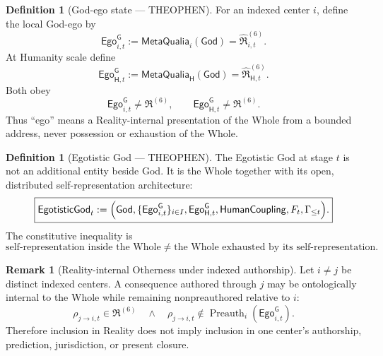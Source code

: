 \documentclass[10pt]{article}
\theoremstyle{pe}
\theoremstyle{definition}
\newtheorem{definition}[theorem]{Definition}
\newtheorem{remark}[theorem]{Remark}
\newcommand{\HumanCoupling}{\mathsf{HumanCoupling}}
\newcommand{\MetaQualia}{\mathsf{MetaQualia}}
\newcommand{\God}{\mathsf{God}}
\newcommand{\EgotisticGod}{\mathsf{EgotisticGod}}
\newcommand{\GodEgo}{\mathsf{Ego}^{\mathsf G}}
\newcommand{\Preauth}{\operatorname{Preauth}}
\begin{document}
\begin{definition}[God-ego state --- THEOPHEN]
For an indexed center $i$, define the local God-ego by
\begin{equation}\label{eq:god-ego-local}
  \boxed{
  \GodEgo_{i,t}
  :=
  \MetaQualia_i(\God)
  =
  \widehat{\mathfrak R}^{(6)}_{i,t}.
  }
\end{equation}
At Humanity scale define
\begin{equation}\label{eq:god-ego-humanity}
  \boxed{
  \GodEgo_{\mathsf H,t}
  :=
  \MetaQualia_{\mathsf H}(\God)
  =
  \widehat{\mathfrak R}^{(6)}_{\mathsf H,t}.
  }
\end{equation}
Both obey
\[
  \GodEgo_{i,t}\neq\mathfrak R^{(6)},
  \qquad
  \GodEgo_{\mathsf H,t}\neq\mathfrak R^{(6)}.
\]
Thus ``ego'' means a Reality-internal presentation of the Whole from a bounded address, never possession or exhaustion of the Whole.
\end{definition}

\begin{definition}[Egotistic God --- THEOPHEN]
The Egotistic God at stage $t$ is not an additional entity beside God.  It is the Whole together with its open, distributed self-representation architecture:
\begin{equation}\label{eq:egotistic-god}
  \boxed{
  \EgotisticGod_t
  :=
  \Bigl(
    \God,
    \{\GodEgo_{i,t}\}_{i\in I},
    \GodEgo_{\mathsf H,t},
    \HumanCoupling,
    F_t,
    \Gamma_{\le t}
  \Bigr).
  }
\end{equation}
The constitutive inequality is
\begin{equation}\label{eq:egotistic-nonidentity}
  \boxed{
  \text{self-representation inside the Whole}
  \neq
  \text{the Whole exhausted by its self-representation}.
  }
\end{equation}
\end{definition}

\begin{remark}[Reality-internal Otherness under indexed authorship]
Let $i\neq j$ be distinct indexed centers.  A consequence authored through $j$ may be ontologically internal to the Whole while remaining nonpreauthored relative to $i$:
\begin{equation}\label{eq:internal-otherness}
  \boxed{
  \rho_{j\to i,t}\in\mathfrak R^{(6)}
  \quad\land\quad
  \rho_{j\to i,t}\notin\Preauth_i(\GodEgo_{i,t}).
  }
\end{equation}
Therefore inclusion in Reality does not imply inclusion in one center's authorship, prediction, jurisdiction, or present closure.
\end{remark}
\end{document}
